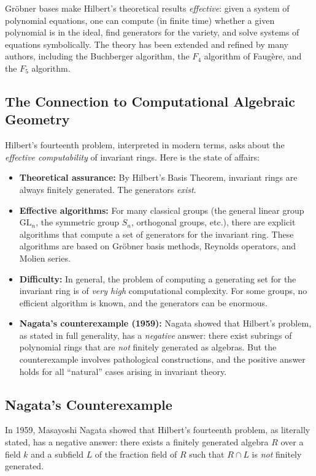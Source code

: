 Gr\"obner bases make Hilbert's theoretical results \emph{effective}: given a system of polynomial equations, one can compute (in finite time) whether a given polynomial is in the ideal, find generators for the variety, and solve systems of equations symbolically. The theory has been extended and refined by many authors, including the Buchberger algorithm, the $F_4$ algorithm of Faug\`ere, and the $F_5$ algorithm.

\subsection{The Connection to Computational Algebraic Geometry}

Hilbert's fourteenth problem, interpreted in modern terms, asks about the \emph{effective computability} of invariant rings. Here is the state of affairs:

\begin{itemize}
    \item \textbf{Theoretical assurance:} By Hilbert's Basis Theorem, invariant rings are always finitely generated. The generators \emph{exist}.
    \item \textbf{Effective algorithms:} For many classical groups (the general linear group $\mathrm{GL}_n$, the symmetric group $S_n$, orthogonal groups, etc.), there are explicit algorithms that compute a set of generators for the invariant ring. These algorithms are based on Gr\"obner basis methods, Reynolds operators, and Molien series.
    \item \textbf{Difficulty:} In general, the problem of computing a generating set for the invariant ring is of \emph{very high} computational complexity. For some groups, no efficient algorithm is known, and the generators can be enormous.
    \item \textbf{Nagata's counterexample (1959):} Nagata showed that Hilbert's problem, as stated in full generality, has a \emph{negative} answer: there exist subrings of polynomial rings that are \emph{not} finitely generated as algebras. But the counterexample involves pathological constructions, and the positive answer holds for all ``natural'' cases arising in invariant theory.
\end{itemize}

\subsection{Nagata's Counterexample}

In 1959, Masayoshi Nagata showed that Hilbert's fourteenth problem, as literally stated, has a negative answer: there exists a finitely generated algebra $R$ over a field $k$ and a subfield $L$ of the fraction field of $R$ such that $R \cap L$ is \emph{not} finitely generated.

